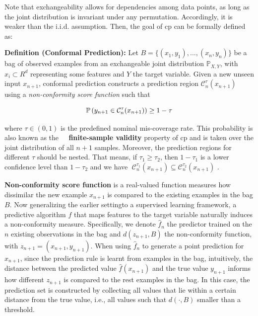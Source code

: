 \documentclass[a4paper,oneside,bibliography=totoc]{scrbook}
\begin{document}
\noindent Note that exchangeability allows for dependencies among data points, as long as the joint distribution is invariant under any permutation. Accordingly, it is weaker than the i.i.d. assumption. Then, the goal of \gls{cp} can be formally defined as: 
\newline

\noindent
\textbf{Definition (Conformal Prediction):}  Let \(B = \{(x_1, y_1), \dots, (x_n, y_n)\}\) be a bag of observed examples from an exchangeable joint distribution $\mathbb{P}_{X,Y}$, with $x_i \subset R^d$ representing some features and  $Y$ the target variable. Given a new unseen input \(x_{n+1}\), conformal prediction constructs a prediction region \( \mathcal{C}_n^\tau(x_{n+1}) \) using a \textit{non-conformity score function} such that
\vspace{0.7em}

\begin{equation}
\mathbb{P}\left( y_{n+1} \in \mathcal{C}_n^\tau(x_{n+1}) \right) \geq 1 - \tau
\vspace{1em}
\label{eq: finitecp}
\end{equation}

\noindent
where \( \tau \in (0, 1) \) is the predefined nominal mis-coverage rate. This probability is also known as the \textbf{finite-sample validity} property of \gls{cp} and is taken over the joint distribution of all \(n + 1\) samples. Moreover, the prediction regions for different $\tau$ should be nested. That means, if  $\tau_1 \ge \tau_2$, then $1 - \tau_1$ is a lower confidence level than $1 - \tau_2$ and we have $ \; \mathcal{C}_n^{\tau_1}(x_{n+1}) \subseteq \mathcal{C}_n^{\tau_2}(x_{n+1})$ \cite{shafer2008tutorial}.  

\vspace{0.7em}
\textbf{Non-conformity score function} is a real-valued function  measures how dissimilar the new example $x_{n+1}$ is compared to the existing examples in the bag $B$. Now generalizing the earlier settingto a supervised learning framework, a predictive algorithm $f$ that maps features to the target variable naturally induces a non-conformity measure. Specifically, we denote $\hat{f}_n$ the predictor trained on the $n$ existing observations in the bag and $d(z_{n+1}, B)$ the non-conformity function, with $z_{n+1} = (x_{n+1}, y_{n+1})$. When using $\hat{f}_n$ to generate a point prediction for $x_{n+1}$, since the prediction rule is learnt from examples in the bag, intuitively, the distance between the predicted value $\hat{f}(x_{n+1})$ and the true value $y_{n+1}$ informs how different $z_{n+1}$ is compared to the rest examples in the bag. In this case, the prediction set is constructed by collecting all values that lie within a certain distance from the true value, i.e., all values such that $d(\cdot, B)$ smaller than a threshold.
\end{document}
